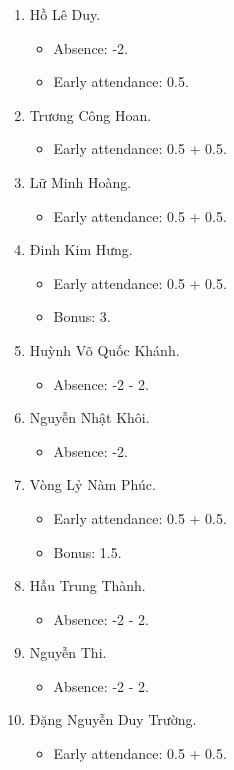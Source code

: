 \documentclass{article}
\begin{document}
\begin{enumerate}
	\item {\sc Hồ Lê Duy.}
	\begin{itemize}
		\item Absence: -2.
		\item Early attendance: 0.5.
	\end{itemize}
	\item {\sc Trương Công Hoan.}
	\begin{itemize}
		\item Early attendance: 0.5 + 0.5.
	\end{itemize}
	\item {\sc Lữ Minh Hoàng.}
	\begin{itemize}
		\item Early attendance: 0.5 + 0.5.
	\end{itemize}
	\item {\sc Đinh Kim Hưng.}
	\begin{itemize}
		\item Early attendance: 0.5 + 0.5.
		\item Bonus: 3.
	\end{itemize}
	\item {\sc Huỳnh Võ Quốc Khánh.}
	\begin{itemize}
		\item Absence: -2 - 2.
	\end{itemize}
	\item {\sc Nguyễn Nhật Khôi.}
	\begin{itemize}
		\item Absence: -2.
	\end{itemize}
	\item {\sc Vòng Lỷ Nàm Phúc.}
	\begin{itemize}
		\item Early attendance: 0.5 + 0.5.
		\item Bonus: 1.5.
	\end{itemize}
	\item {\sc Hầu Trung Thành.}
	\begin{itemize}
		\item Absence: -2 - 2.
	\end{itemize}
	\item {\sc Nguyễn Thi.}
	\begin{itemize}
		\item Absence: -2 - 2.
	\end{itemize}
	\item {\sc Đặng Nguyễn Duy Trường.}
	\begin{itemize}
		\item Early attendance: 0.5 + 0.5.
	\end{itemize}
\end{enumerate}
\end{document}
